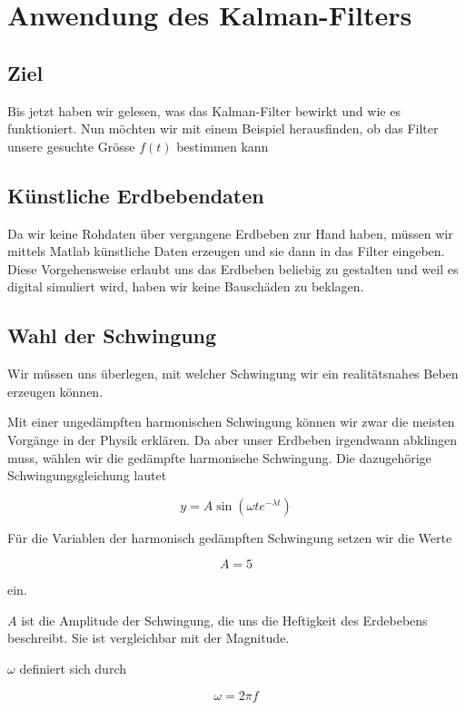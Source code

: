 \section{Anwendung des Kalman-Filters}
\subsection{Ziel}
Bis jetzt haben wir gelesen, was das Kalman-Filter bewirkt und wie es funktioniert.
Nun möchten wir mit einem Beispiel herausfinden, ob das Filter unsere gesuchte Grösse $f(t)$ bestimmen kann

\subsection{Künstliche Erdbebendaten}
Da wir keine Rohdaten über vergangene Erdbeben zur Hand haben, müssen wir mittels Matlab künstliche Daten erzeugen und sie dann in das Filter eingeben.
Diese Vorgehensweise erlaubt uns das Erdbeben beliebig zu gestalten und weil es digital simuliert wird, haben wir keine Bauschäden zu beklagen.

\subsection{Wahl der Schwingung}
Wir müssen uns überlegen, mit welcher Schwingung wir ein realitätsnahes Beben erzeugen können.

Mit einer ungedämpften harmonischen Schwingung können wir zwar die meisten Vorgänge in der Physik erklären.
Da aber unser Erdbeben irgendwann abklingen muss, wählen wir die gedämpfte harmonische Schwingung.
Die dazugehörige Schwingungsgleichung lautet

\begin{equation}
	y = A \sin(\omega t e^{-\lambda t})
\end{equation} 

Für die Variablen der harmonisch gedämpften Schwingung setzen wir die Werte

\begin{equation}
A = 5
\end{equation} 

ein.

$A$ ist die Amplitude der Schwingung, die uns die Heftigkeit des Erdebebens beschreibt.
Sie ist vergleichbar mit der Magnitude.

$\omega$ definiert sich durch 

\begin{equation}
	\omega = 2 \pi f
\end{equation}

